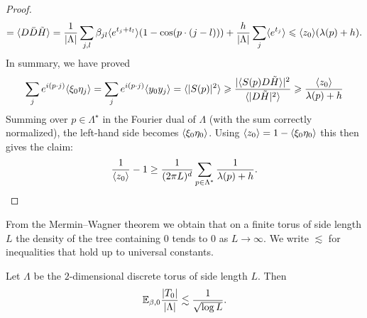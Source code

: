 \documentclass[11pt]{amsart}
\numberwithin{equation}{section}
\numberwithin{theorem}{section}
\newcommand{\Hhoro}{\tilde H}
\begin{document}
\begin{proof}
\begin{equation}
    =
    \avg{D\bar D\Hhoro}
    =
      \frac{1}{|\Lambda|} \sum_{j,l} \beta_{jl} \avg{e^{t_j+t_l}} (1-\cos(p\cdot (j-l))) + \frac{h}{|\Lambda|} \sum_j \avg{e^{t_j}}
    \leq
    \avg{z_0} ( \lambda(p) + h ).
  \end{equation}
  In summary, we have proved
  \begin{equation}
    \sum_{j} e^{i (p\cdot j)} \avg{\xi_0\eta_{j}}
    =
    \sum_{j} e^{i (p\cdot j)} \avg{y_0y_{j}}
    =
    \avg{|S(p)|^2}
    \geq \frac{|\avg{S(p)D\Hhoro}|^2}{\avg{|D\Hhoro|^2}}
    \geq
    \frac{\avg{z_0}}{\lambda(p) + h}
  \end{equation}
  Summing over $p \in \Lambda^{\star}$ in the Fourier dual of
  $\Lambda$ (with the sum correctly normalized), the left-hand side
  becomes $\langle \xi_0\eta_0 \rangle$. Using $\langle z_0 \rangle = 1-\langle \xi_0\eta_0 \rangle$
  this then gives the claim:
  \begin{equation}
    \frac{1}{\langle z_0 \rangle}-1 \ge \frac{1}{(2\pi L)^d} \sum_{p\in\Lambda^*} \frac{1}{\lambda(p) + h}. \qedhere
  \end{equation}
\end{proof}



From the Mermin--Wagner theorem we obtain that on a finite torus of side length $L$
the density of the tree containing $0$ tends to $0$ as
$L\to\infty$. We write $\lesssim$ for inequalities that hold up
  to universal constants.

\begin{corollary}
Let $\Lambda$ be the $2$-dimensional discrete torus of side length $L$. Then
\begin{equation}
  \mathbb{E}_{\beta,0} \frac{|T_0|}{|\Lambda|}  \lesssim \frac{1}{\sqrt{\log L}}.
\end{equation}
\end{corollary}
\end{document}
